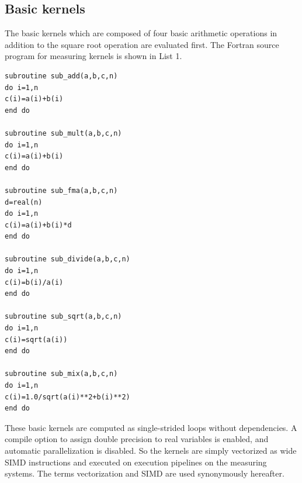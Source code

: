 \documentclass[conference]{IEEEtran}
\begin{document}
\begin{table}[tb]
\end{table}

%
\subsection{Basic kernels}
\label{subsection:basic-kernels}

The basic kernels which are composed of four basic arithmetic operations in addition to the square root operation
are evaluated first.
The Fortran source program for measuring kernels is shown in List 1.

\begin{lstlisting}[caption={basic kernels (partial list)}]
subroutine sub_add(a,b,c,n)
do i=1,n
c(i)=a(i)+b(i)
end do

subroutine sub_mult(a,b,c,n)
do i=1,n
c(i)=a(i)+b(i)
end do

subroutine sub_fma(a,b,c,n)
d=real(n)
do i=1,n
c(i)=a(i)+b(i)*d
end do

subroutine sub_divide(a,b,c,n)
do i=1,n
c(i)=b(i)/a(i)
end do

subroutine sub_sqrt(a,b,c,n)
do i=1,n
c(i)=sqrt(a(i))
end do

subroutine sub_mix(a,b,c,n)
do i=1,n
c(i)=1.0/sqrt(a(i)**2+b(i)**2)
end do
\end{lstlisting}

These basic kernels are computed as single-strided loops without dependencies.
A compile option to assign double precision to real variables is enabled,
and automatic parallelization is disabled.
So the kernels are simply vectorized as wide SIMD instructions and
executed on execution pipelines on the measuring systems.
The terms vectorization and SIMD are used synonymously hereafter.
\end{document}
